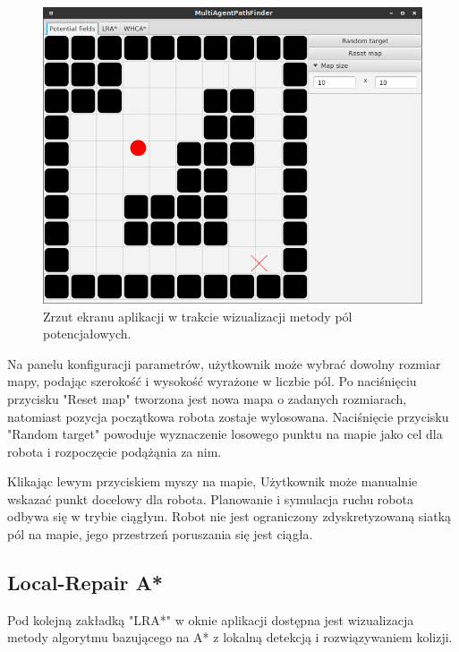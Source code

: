 \begin{figure}
	\centering
	\includegraphics[width=0.8\columnwidth]{img/robopath/ui-fields}
	\caption{Zrzut ekranu aplikacji w trakcie wizualizacji metody pól potencjałowych.}
	\label{fig:robopath-ui-fields}
\end{figure}

Na panelu konfiguracji parametrów, użytkownik może wybrać dowolny rozmiar mapy, podając szerokość i wysokość wyrażone w liczbie pól.
Po naciśnięciu przycisku "Reset map" tworzona jest nowa mapa o zadanych rozmiarach, natomiast pozycja początkowa robota zostaje wylosowana.
Naciśnięcie przycisku "Random target" powoduje wyznaczenie losowego punktu na mapie jako cel dla robota i rozpoczęcie podążąnia za nim.

Klikając lewym przyciskiem myszy na mapie, Użytkownik może manualnie wskazać punkt docelowy dla robota.
Planowanie i symulacja ruchu robota odbywa się w trybie ciągłym. Robot nie jest ograniczony zdyskretyzowaną siatką pól na mapie, jego przestrzeń poruszania się jest ciągła.

\subsection{Local-Repair A*}
\label{ch:app-lra}
Pod kolejną zakładką "LRA*" w oknie aplikacji dostępna jest wizualizacja metody algorytmu bazującego na A* z lokalną detekcją i rozwiązywaniem kolizji.

